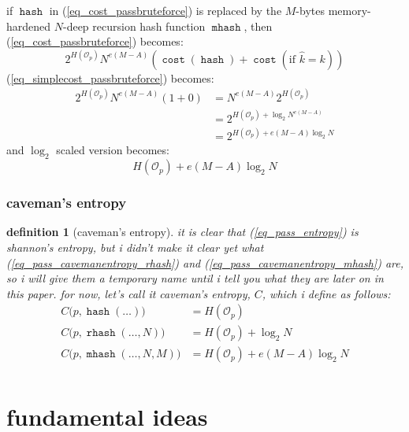 \documentclass[twocolumn]{article}
\newtheorem{definition}{definition}[section]
\DeclareMathOperator{\hash}{\mathtt{hash}}
\DeclareMathOperator{\rhash}{\mathtt{rhash}}
\DeclareMathOperator{\mhash}{\mathtt{mhash}}
\DeclareMathOperator{\cost}{\mathtt{cost}}
\begin{document}
if $\hash$ in (\ref{eq_cost_passbruteforce}) is replaced by the $M$-bytes
memory-hardened $N$-deep recursion hash function $\mhash$, then
(\ref{eq_cost_passbruteforce}) becomes:
\begin{equation}\label{eq_cost_passbruteforce_NM}
    2^{H(\mathcal{O}_p)} N^{e(M-A)} \left(
        \cost(\hash) + \cost(\text{if } \hat k = k)
    \right)
\end{equation}
(\ref{eq_simplecost_passbruteforce}) becomes:
\begin{equation}\label{eq_simplecost_passbruteforce_NM}
    \begin{split}
    2^{H(\mathcal{O}_p)} N^{e(M-A)} (1+0) 
                  &= N^{e(M-A)} 2^{H(\mathcal{O}_p)}\\
                  &= 2^{H(\mathcal{O}_p) + \log_2 N^{e(M-A)}} \\
                  &= 2^{H(\mathcal{O}_p) + e(M-A)\log_2 N}
    \end{split}
\end{equation}
and $\log_2$ scaled version becomes:
\begin{equation}\label{eq_pass_cavemanentropy_mhash}
    H(\mathcal{O}_p) + e(M-A)\log_2 N
\end{equation}

\subsubsection{caveman's entropy}
\begin{definition}[caveman's entropy]\label{def_cavemanentropy}
it is clear that (\ref{eq_pass_entropy}) is shannon's entropy, but i didn't
make it clear yet what (\ref{eq_pass_cavemanentropy_rhash}) and
(\ref{eq_pass_cavemanentropy_mhash}) are, so i will give them a temporary
name until i tell you what they are later on in this paper.  for now, let's
call it \emph{caveman's entropy}, $C$, which i define as follows:
\[
\begin{split}
C\Big(p, \hash(\ldots)\Big) &= H(\mathcal{O}_p) \\
C\Big(p, \rhash(\ldots, N)\Big) &= H(\mathcal{O}_p) + \log_2 N \\
C\Big(p, \mhash(\ldots, N, M)\Big) &= H(\mathcal{O}_p) + e(M-A)\log_2 N \\
\end{split}
\]
\end{definition}

\section{fundamental ideas}\label{sec_fundamental_ideas}
\end{document}
